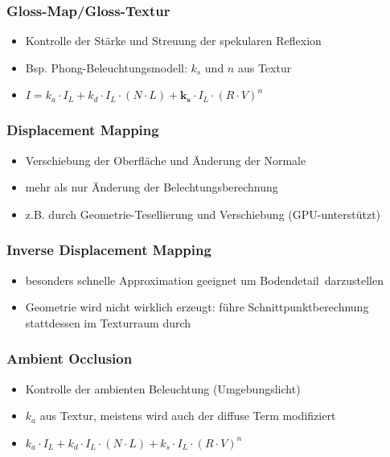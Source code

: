 \documentclass[paper=a4, fontsize=11pt]{scrartcl} %
\numberwithin{equation}{section} %
\numberwithin{figure}{section} %
\numberwithin{table}{section} %
\begin{document}
\subsubsection{Gloss-Map/Gloss-Textur}

\begin{itemize}
\item Kontrolle der Stärke und Streuung der spekularen Reflexion
\item Bsp. Phong-Beleuchtungsmodell: $k_s$ und $n$ aus Textur
\item $I = k_a \cdot I_L + k_d \cdot I_L \cdot (N \cdot L) + \boldsymbol{k_s} \cdot I_L \cdot (R \cdot V)^n$
\end{itemize}

\subsubsection{Displacement Mapping}

\begin{itemize}
\item Verschiebung der Oberfläche und Änderung der Normale
\item mehr als nur Änderung der Belechtungsberechnung
\item z.B. durch Geometrie-Tesellierung und Verschiebung (GPU-unterstützt)
\end{itemize}

\subsubsection{Inverse Displacement Mapping}

\begin{itemize}
\item besonders schnelle Approximation geeignet um \glqq Bodendetail\grqq\ darzustellen
\item Geometrie wird nicht wirklich erzeugt: führe Schnittpunktberechnung stattdessen im Texturraum durch
\end{itemize}

\subsubsection{Ambient Occlusion}

\begin{itemize}
\item Kontrolle der ambienten Beleuchtung (Umgebungslicht)
\item $k_a$ aus Textur, meistens wird auch der diffuse Term modifiziert
\item $k_a \cdot I_L + k_d \cdot I_L \cdot (N \cdot L) + k_s \cdot I_L \cdot (R \cdot V)^n$
\end{itemize}
\end{document}
